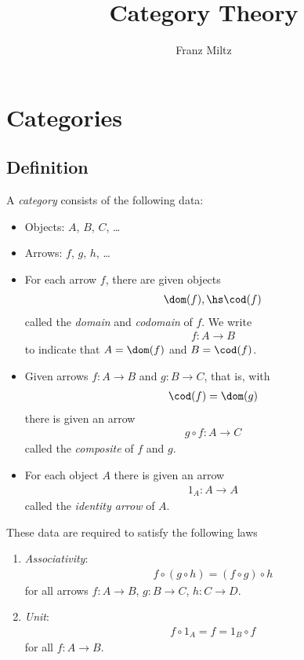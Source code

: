 \documentclass{article}
\begin{document}
\mkawodeythms
\title{Category Theory}
\author{Franz Miltz}
\maketitle
\tableofcontents
\pagebreak

\section{Categories}

\subsection{Definition}

\begin{definition}
    A \emph{category} consists of the following data:
    \begin{itemize}
        \item Objects: $A$, $B$, $C$, \dots
        \item Arrows: $f$, $g$, $h$, \dots
        \item For each arrow $f$, there are given objects \begin{align*}
            \dom(f),\hs \cod(f)
        \end{align*}
        called the \emph{domain} and \emph{codomain} of $f$. We write
        \begin{align*}
            f:A\to B
        \end{align*}
        to indicate that $A=\dom(f)$ and $B=\cod(f)$.
        \item Given arrows $f:A\to B$ and $g:B\to C$, that is, with \begin{align*}
            \cod(f) = \dom(g)
        \end{align*}
        there is given an arrow
        \begin{align*}
            g\circ f: A\to C
        \end{align*}
        called the \emph{composite} of $f$ and $g$.
        \item For each object $A$ there is given an arrow \begin{align*}
            1_A : A\to A
        \end{align*}
        called the \emph{identity arrow} of $A$.
    \end{itemize}
    These data are required to satisfy the following laws \begin{enumerate}[label=C\arabic*.]
        \item \emph{Associativity}: \begin{align*}
            f \circ (g \circ h) = (f\circ g) \circ h
        \end{align*}
        for all arrows $f:A\to B$, $g:B\to C$, $h:C\to D$.
        \item \emph{Unit}: \begin{align*}
            f \circ 1_A = f = 1_B \circ f
        \end{align*}
        for all $f:A\to B$.
    \end{enumerate}
\end{definition}
\end{document}
